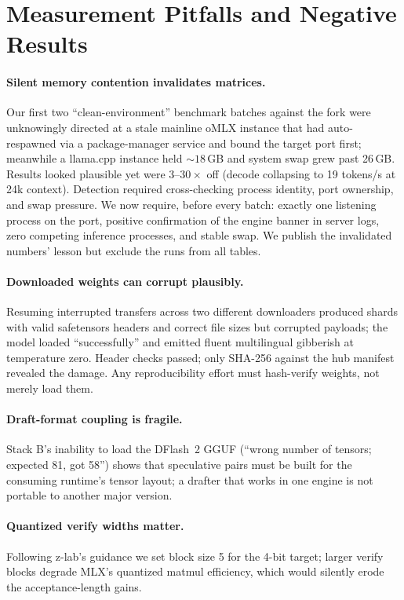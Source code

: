 \documentclass[11pt]{article}
\newcommand{\dflash}{DFlash~2}
\newcommand{\omlx}{oMLX}
\begin{document}
\section{Measurement Pitfalls and Negative Results}
\label{sec:pitfalls}

\paragraph{Silent memory contention invalidates matrices.} Our first two
``clean-environment'' benchmark batches against the fork were unknowingly
directed at a stale mainline \omlx{} instance that had auto-respawned via a
package-manager service and bound the target port first; meanwhile a llama.cpp
instance held ${\sim}18$\,GB and system swap grew past 26\,GB. Results looked
plausible yet were $3$--$30\times$ off (decode collapsing to 19 tokens/s at
24k context). Detection required cross-checking process identity, port
ownership, and swap pressure. We now require, before every batch: exactly one
listening process on the port, positive confirmation of the engine banner in
server logs, zero competing inference processes, and stable swap. We publish
the invalidated numbers' lesson but exclude the runs from all tables.

\paragraph{Downloaded weights can corrupt plausibly.} Resuming interrupted
transfers across two different downloaders produced shards with valid
safetensors headers and correct file sizes but corrupted payloads; the model
loaded ``successfully'' and emitted fluent multilingual gibberish at temperature
zero. Header checks passed; only SHA-256 against the hub manifest revealed the
damage. Any reproducibility effort must hash-verify weights, not merely load
them.

\paragraph{Draft-format coupling is fragile.} Stack B's inability to load the
\dflash{} GGUF (``wrong number of tensors; expected 81, got 58'') shows that
speculative pairs must be built for the consuming runtime's tensor layout; a
drafter that works in one engine is not portable to another major version.

\paragraph{Quantized verify widths matter.} Following z-lab's guidance we set
block size 5 for the 4-bit target; larger verify blocks degrade MLX's quantized
matmul efficiency, which would silently erode the acceptance-length gains.
\end{document}
